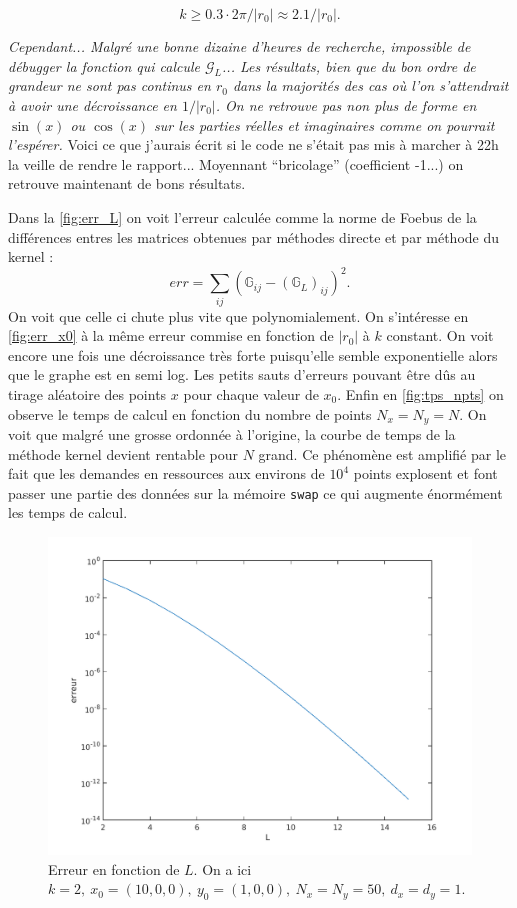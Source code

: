 \documentclass[11pt]{article}
\newcommand{\lG}{\mathcal{G}}
\newcommand{\Gm}{\mathbb{G}}
\begin{document}
\begin{equation}
  \label{eq:cddk}
  k\geq 0.3\cdot 2 \pi/ |r_0| \approx 2.1/|r_0|.
\end{equation}


\emph{\small Cependant... Malgré une bonne dizaine d'heures de recherche, impossible de débugger la fonction qui calcule $\lG_L$... Les résultats, bien
que du bon ordre de grandeur ne sont pas continus en $r_0$ dans la majorités des cas o\`u l'on s'attendrait à avoir une décroissance en
$1/|r_0|$. On ne retrouve pas non plus de forme en $\sin(x)$ ou $\cos(x)$ sur les parties réelles et imaginaires comme on pourrait
l'espérer.} Voici ce que j'aurais écrit si le code ne s'était pas mis à marcher à 22h la veille de rendre le rapport... Moyennant ``bricolage'' (coefficient -1...) on
retrouve maintenant de bons résultats.

Dans la \autoref{fig:err_L} on voit l'erreur calculée comme la norme de Foebus de la différences entres les matrices obtenues par méthodes
directe et par méthode du kernel :
\[
  err = \sum_{ij} (\Gm_{ij} - (\Gm_L)_{ij})^2.
\]
On voit que celle ci chute plus vite que polynomialement. On s'intéresse en \autoref{fig:err_x0} à la même erreur commise en fonction de $|r_0|$
à $k$ constant. On voit encore une fois une décroissance très forte puisqu'elle semble exponentielle alors que le graphe est en semi log. Les
petits sauts d'erreurs pouvant être dûs au tirage aléatoire des points $x$ pour chaque valeur de $x_0$. Enfin en \autoref{fig:tps_npts} on
observe le temps de calcul en fonction du nombre de points $N_x = N_y = N$. On voit que malgré une grosse ordonnée à l'origine, la courbe de
temps de la méthode kernel devient rentable pour $N$ grand. Ce phénomène est amplifié par le fait que les demandes en ressources
aux environs de $10^4$ points explosent et font passer une partie des données sur la mémoire \texttt{swap} ce qui augmente énormément les temps de calcul.

\begin{figure}
  \centering
  \includegraphics[height=.35\textheight]{err_L}
  \caption{Erreur en fonction de $L$. On a ici $k=2,~x_0=(10,0,0),~y_0=(1,0,0),~ N_x = N_y = 50, ~d_x=d_y=1.$}
  \label{fig:err_L}
\end{figure}
\end{document}
